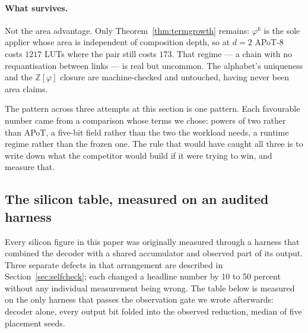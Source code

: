 \documentclass[11pt]{article}
\theoremstyle{definition}
\begin{document}
\paragraph{What survives.} Not the area advantage. Only
Theorem~\ref{thm:termgrowth} remains: $\varphi^{k}$ is the sole applier whose
area is independent of composition depth, so at $d=2$ APoT-8 costs $1217$ LUTs
where the pair still costs $173$. That regime --- a chain with no requantisation
between links --- is real but uncommon. The alphabet's uniqueness and the
$\mathbb{Z}[\varphi]$ closure are machine-checked and untouched, having never
been area claims.

The pattern across three attempts at this section is one pattern. Each favourable
number came from a comparison whose terms we chose: powers of two rather than
APoT, a five-bit field rather than the two the workload needs, a runtime regime
rather than the frozen one. The rule that would have caught all three is to write
down what the competitor would build if it were trying to win, and measure that.




\subsection{The silicon table, measured on an audited harness}
\label{sec:cleantable}

Every silicon figure in this paper was originally measured through a harness that
combined the decoder with a shared accumulator and observed part of its output.
Three separate defects in that arrangement are described in
Section~\ref{sec:selfcheck}; each changed a headline number by 10 to 50 percent
without any individual measurement being wrong. The table below is measured on
the only harness that passes the observation gate we wrote afterwards: decoder
alone, every output bit folded into the observed reduction, median of five
placement seeds.
\end{document}
